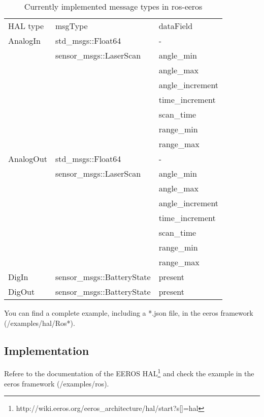 \begin{table}[]
\centering
\caption{Currently implemented message types in ros-eeros}
\label{tableImplementedMsgTypes}
\begin{tabular}{lll}
\cline{2-3}
HAL type  & msgType                    & dataField        \\ \cline{2-3} 
AnalogIn  & std\_msgs::Float64         & -                \\
          & sensor\_msgs::LaserScan    & angle\_min       \\
          &                            & angle\_max       \\
          &                            & angle\_increment \\
          &                            & time\_increment  \\
          &                            & scan\_time       \\
          &                            & range\_min       \\
          &                            & range\_max       \\
AnalogOut & std\_msgs::Float64         & -                \\
          & sensor\_msgs::LaserScan    & angle\_min       \\
          &                            & angle\_max       \\
          &                            & angle\_increment \\
          &                            & time\_increment  \\
          &                            & scan\_time       \\
          &                            & range\_min       \\
          &                            & range\_max       \\
DigIn     & sensor\_msgs::BatteryState & present          \\
DigOut    & sensor\_msgs::BatteryState & present          \\ \cline{2-3} 
\end{tabular}
\end{table}

You can find a complete example, including a *.json file, in the eeros framework (/examples/hal/Ros*).


\subsection{Implementation}
Refere to the documentation of the EEROS HAL\footnote{http://wiki.eeros.org/eeros\_architecture/hal/start?s[]=hal} and check the example in the eeros framework (/examples/ros).

